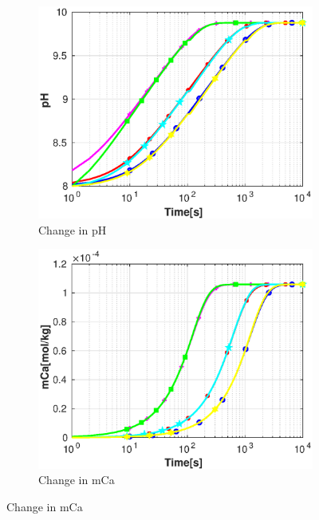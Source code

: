 \begin{figure}
   \centering
   \begin{subfigure}{.5\linewidth}
            \centering
        \includegraphics[width=\textwidth]{PICTURES/dvm_pH8_pH.eps}
        \caption{\small Change in pH}
        \label{fig:dvmpH8pH}
    \end{subfigure}%
        \hfill
    \begin{subfigure}{.5\linewidth}
            \centering
        \includegraphics[width=\textwidth]{PICTURES/dvm_pH8_mCa.eps}
        \caption{\small Change in mCa}
        \label{fig:dvmpH8mCa}
    \end{subfigure}%

\end{figure}
